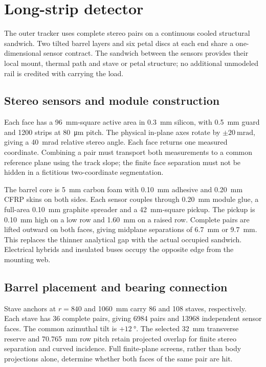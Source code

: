 \section{Long-strip detector}
\label{sec:long-strips}
The outer tracker uses complete stereo pairs on a continuous cooled structural
sandwich. Two tilted barrel layers and six petal discs at each end share a
one-dimensional sensor contract. The sandwich between the sensors provides
their local mount, thermal path and stave or petal structure; no additional
unmodeled rail is credited with carrying the load.

\subsection{Stereo sensors and module construction}
Each face has a \qty{96}{\milli\metre}-square active area in
\qty{0.3}{\milli\metre} silicon, with \qty{0.5}{\milli\metre} guard and
1200 strips at \qty{80}{\micro\metre} pitch. The physical in-plane axes rotate
by $\pm\qty{20}{\milli\radian}$, giving a \qty{40}{\milli\radian} relative
stereo angle. Each face returns one measured coordinate. Combining a pair must
transport both measurements to a common reference plane using the track slope;
the finite face separation must not be hidden in a fictitious two-coordinate
segmentation.

The barrel core is \qty{5}{\milli\metre} carbon foam with
\qty{0.10}{\milli\metre} adhesive and \qty{0.20}{\milli\metre} CFRP skins on
both sides. Each sensor couples through \qty{0.20}{\milli\metre} module glue,
a full-area \qty{0.10}{\milli\metre} graphite spreader and a
\qty{42}{\milli\metre}-square pickup. The pickup is
\qty{0.10}{\milli\metre} high on a low row and
\qty{1.60}{\milli\metre} on a raised row. Complete pairs are lifted outward
on both faces, giving midplane separations of \qty{6.7}{\milli\metre} or
\qty{9.7}{\milli\metre}. This replaces the thinner analytical gap with the
actual occupied sandwich. Electrical hybrids and insulated buses occupy the
opposite edge from the mounting web.

\subsection{Barrel placement and bearing connection}
Stave anchors at $r=840$ and \qty{1060}{\milli\metre} carry 86 and 108 staves,
respectively. Each stave has 36 complete pairs, giving \num{6984} pairs and
\num{13968} independent sensor faces. The common azimuthal tilt is
$+\qty{12}{\degree}$. The selected \qty{32}{\milli\metre} transverse reserve
and \qty{70.765}{\milli\metre} row pitch retain projected overlap for finite
stereo separation and curved incidence. Full finite-plane screens, rather than
body projections alone, determine whether both faces of the same pair are hit.

